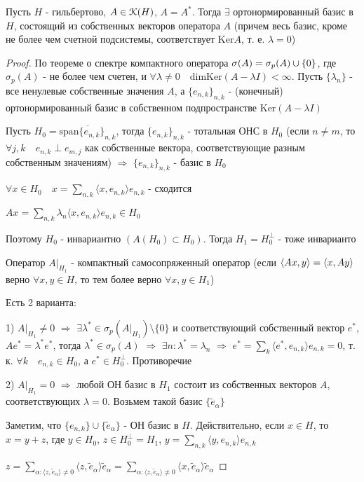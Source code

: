 \documentclass[a4paper,12pt]{report}
\newcommand*{\hm}[1]{#1\nobreak\discretionary{}%
            {\hbox{$\mathsurround=0pt #1$}}{}}
\begin{document}
\begin{thm}
Пусть $H$ - гильбертово, $A\in\EuScript K(H)$, $A=A^*$. Тогда $\exists$ ортонормированный базис в $H$, состоящий из собственных векторов оператора $A$ (причем весь базис, кроме не более чем счетной подсистемы, соответствует $\mathrm{Ker}A$, т. е. $\lambda=0$)
\end{thm}
\begin{proof}
По теореме о спектре компактного оператора $\sigma(A)\hm=\sigma_p(A)\cup\{0\}$, где $\sigma_p(A)$ - не более чем счетен, и $\forall\lambda\ne0\quad{\mathrm{dimKer}(A-\lambda I)<\infty}$. Пусть $\{\lambda_n\}$ - все ненулевые собственные значения $A$, а $\{e_{n,k}\}_{n,k}$ - (конечный) ортонормированный базис в собственном подпространстве $\mathrm{Ker}(A-\lambda I)$

Пусть $H_0=\overline{\mathrm{span}\{e_{n,k}\}_{n,k}}$, тогда $\{e_{n,k}\}_{n,k}$ - тотальная ОНС в $H_0$ (если $n\ne m$, то $\forall j,k\quad e_{n,k}\perp e_{m,j}$ как собственные вектора, соответствующие разным собственным значениям) $\Rightarrow$ $\{e_{n,k}\}_{n,k}$ - базис в $H_0$

$\forall x\in H_0\quad x=\sum\limits_{n,k}\langle x, e_{n,k}\rangle e_{n,k}$ - сходится

$Ax=\sum\limits_{n,k}\lambda_n\langle x,e_{n,k}\rangle e_{n,k}\in H_0$

Поэтому $H_0$ - инвариантно $(A(H_0)\subset H_0)$. Тогда $H_1=H_0^\perp$ - тоже инварианто

Оператор $A|_{H_1}$ - компактный самосопряженный оператор (если $\langle Ax,y\rangle\hm=\langle x,Ay\rangle$ верно $\forall x,y\in H$, то тем более верно $\forall x,y\in H_1$)

Есть 2 варианта:

1) $A|_{H_1}\ne0$ $\Rightarrow$ $\exists\lambda^*\in\sigma_p(A|_{H_1})\setminus\{0\}$ и соответствующий собственный вектор $e^*$, $Ae^*=\lambda^* e^*$, тогда $\lambda^*\in\sigma_p(A)$ $\Rightarrow$ $\exists n\colon\lambda^*=\lambda_n$ $\Rightarrow$ $e^*=\sum\limits_k\langle e^*,e_{n,k}\rangle {e_{n,k}=0}$, т. к. $\forall k\quad e_{n,k}\in H_0$, а $e^*\in H_0^\perp$. Противоречие

2) $A|_{H_1}=0$ $\Rightarrow$ любой ОН базис в $H_1$ состоит из собственных векторов $A$, соответствующих $\lambda=0$. Возьмем такой базис $\{\tilde e_\alpha\}$

Заметим, что $\{e_{n,k}\}\cup\{\tilde e_\alpha\}$ - ОН базис в $H$. Действительно, если $x\in H$, то $x=y+z$, где $y\in H_0$, $z\in H_0^\perp=H_1$, $y=\sum\limits_{n,k}\langle y,e_{n,k}\rangle e_{n,k}$

$z=\sum\limits_{\alpha\colon\langle z,\tilde e_{\alpha}\rangle\ne0}\langle z,\tilde e_\alpha\rangle\tilde e_\alpha=\sum\limits_{\alpha\colon\langle z,\tilde e_\alpha\rangle\ne0}\langle x,\tilde e_\alpha\rangle\tilde e_\alpha$
\end{proof}
\end{document}
